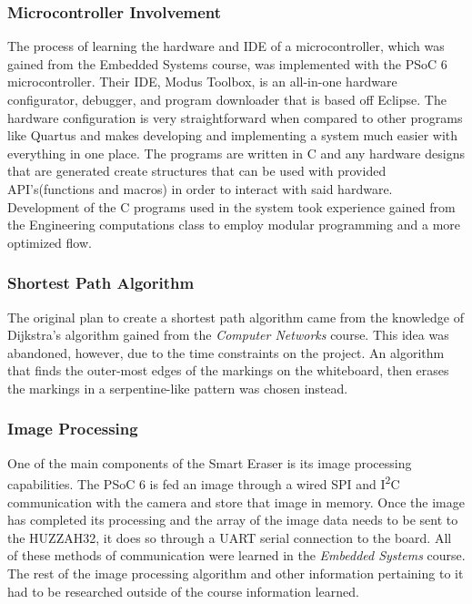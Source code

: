\subsubsection{Microcontroller Involvement}
The process of learning the hardware and IDE of a microcontroller, which was gained from the Embedded Systems course, was implemented with the PSoC 6 microcontroller. Their IDE, Modus Toolbox, is an all-in-one hardware configurator, debugger, and program downloader that is based off Eclipse. The hardware configuration is very straightforward when compared to other programs like Quartus and makes developing and implementing a system much easier with everything in one place. The programs are written in C and any hardware designs that are generated create structures that can be used with provided API's(functions and macros) in order to interact with said hardware. Development of the C programs used in the system took experience gained from the Engineering computations class to employ modular programming and a more optimized flow. \\

\subsubsection{Shortest Path Algorithm}
The original plan to create a shortest path algorithm came from the knowledge of Dijkstra's algorithm gained from the \textit{Computer Networks} course. This idea was abandoned, however, due to the time constraints on the project. An algorithm that finds the outer-most edges of the markings on the whiteboard, then erases the markings in a serpentine-like pattern was chosen instead.\\

\subsubsection{Image Processing}
One of the main components of the Smart Eraser is its image processing capabilities. The PSoC 6 is fed an image through a wired SPI and I\textsuperscript{2}C communication with the camera and store that image in memory. Once the image has completed its processing and the array of the image data needs to be sent to the HUZZAH32, it does so through a UART serial connection to the board. All of these methods of communication were learned in the \textit{Embedded Systems} course. The rest of the image processing algorithm and other information pertaining to it had to be researched outside of the course information learned.\\

